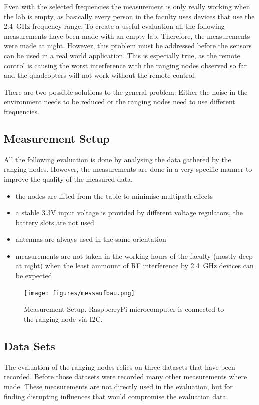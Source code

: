 Even with the selected frequencies the measurement is only really working when the lab is empty, as basically every person in the faculty uses devices that use the \SI{2.4}{GHz} frequency range.
To create a useful evaluation all the following measurements have been made with an empty lab.
Therefore, the measurements were made at night.
However, this problem must be addressed before the sensors can be used in a real world application.
This is especially true, as the remote control is causing the worst interference with the ranging nodes observed so far and the quadcopters will not work without the remote control.

There are two possible solutions to the general problem: Either the noise in the environment needs to be reduced or the ranging nodes need to use different frequencies.


\subsection{Measurement Setup}

All the following evaluation is done by analysing the data gathered by the ranging nodes.
However, the measurements are done in a very specific manner to improve the quality of the measured data.
\begin{itemize}
	\item the nodes are lifted from the table to minimise multipath effects
	\item a stable 3.3V input voltage is provided by different voltage regulators, the battery slots are not used
	\item antennas are always used in the same orientation
	\item measurements are not taken in the working hours of the faculty (mostly deep at night) when the least ammount of RF interference by \SI{2.4}{GHz} devices can be expected
\end{itemize}

\begin{figure}[H]
	\centering
	\texttt{[image: figures/messaufbau.png]}
	\caption[ Measurement Setup ]{ Measurement Setup. RaspberryPi microcomputer is connected to the ranging node via I2C. }
	\label{aufbau}
\end{figure}

\subsection{Data Sets}

The evaluation of the ranging nodes relies on three datasets that have been recorded.
Before those datasets were recorded many other measurements where made.
These measurements are not directly used in the evaluation, but for finding disrupting influences that would compromise the evaluation data.

